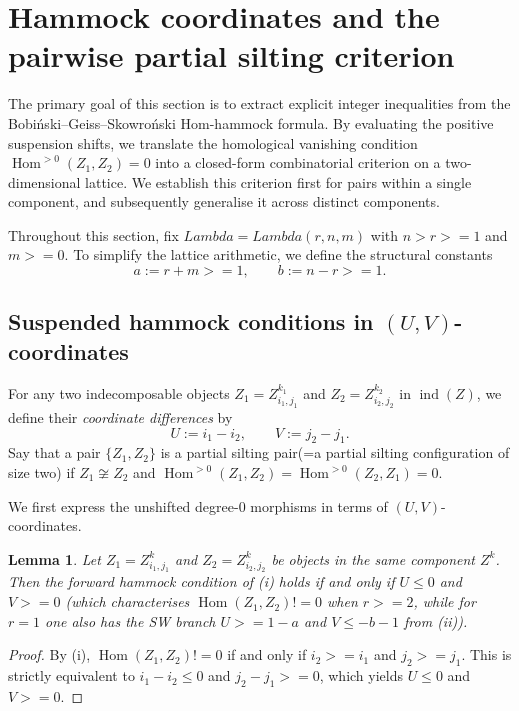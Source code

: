 \documentclass[11pt, a4paper]{article}
\newtheorem{lemma}[theorem]{Lemma}
\theoremstyle{definition}
\def\Lambda{Lambda}%
\def\ss{ss}%
\def\ge{>=}%
\def\neq{!=}%
\def\mathcal#1{#1}%
\begin{document}
\section{Hammock coordinates and the pairwise partial silting criterion}
\label{sec:pairwise}

The primary goal of this section is to extract explicit integer inequalities from the Bobi\'nski--Gei\ss{}--Skowro\'nski Hom-hammock formula. By evaluating the positive suspension shifts, we translate the homological vanishing condition $\operatorname{Hom}^{>0}(Z_1, Z_2) = 0$ into a closed-form combinatorial criterion on a two-dimensional lattice. We establish this criterion first for pairs within a single component, and subsequently generalise it across distinct components.

Throughout this section, fix $\Lambda = \Lambda(r,n,m)$ with $n > r \ge 1$ and $m \ge 0$. To simplify the lattice arithmetic, we define the structural constants
\[
  a := r+m \ge 1, \qquad b := n-r \ge 1.
\]

\subsection{Suspended hammock conditions in \texorpdfstring{$(U,V)$}{(U,V)}-coordinates}\label{subsec:pairwise-susp}

For any two indecomposable objects $Z_1 = Z_{i_1, j_1}^{k_1}$ and $Z_2 = Z_{i_2, j_2}^{k_2}$ in $\operatorname{ind}(\mathcal Z)$, we define their \emph{coordinate differences} by
\[
  U := i_1 - i_2, \qquad V := j_2 - j_1.
\]
Say that a pair $\{Z_1, Z_2\}$ is a partial silting pair(=a partial silting configuration of size two) if $Z_1 \not\cong Z_2$ and $\operatorname{Hom}^{>0}(Z_1, Z_2) = \operatorname{Hom}^{>0}(Z_2, Z_1) = 0$.

We first express the unshifted degree-$0$ morphisms in terms of $(U,V)$-coordinates.

\begin{lemma}\label{lem:hammock-0}
Let $Z_1 = Z_{i_1, j_1}^k$ and $Z_2 = Z_{i_2, j_2}^k$ be objects in the same component $\mathcal Z^k$. Then the forward hammock condition of \textup{(i)} holds if and only if $U \le 0$ and $V \ge 0$ (which characterises $\operatorname{Hom}(Z_1, Z_2) \neq 0$ when $r \ge 2$, while for $r = 1$ one also has the SW branch $U \ge 1-a$ and $V \le -b-1$ from \textup{(ii)}).
\end{lemma}
\begin{proof}
By (i), $\operatorname{Hom}(Z_1, Z_2) \neq 0$ if and only if $i_2 \ge i_1$ and $j_2 \ge j_1$. This is strictly equivalent to $i_1 - i_2 \le 0$ and $j_2 - j_1 \ge 0$, which yields $U \le 0$ and $V \ge 0$.
\end{proof}
\end{document}
